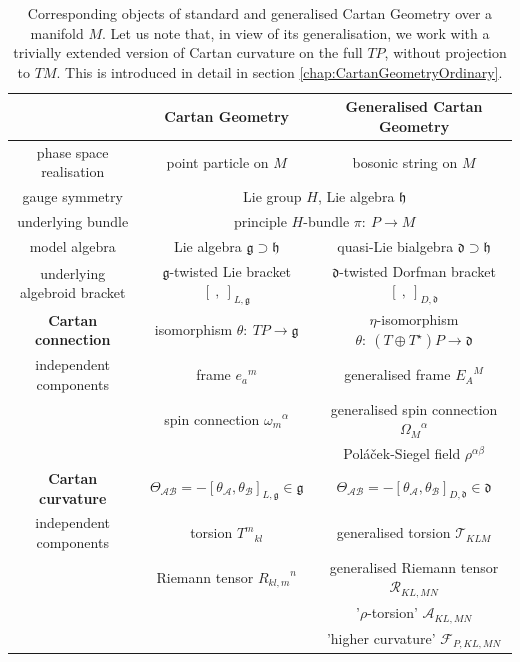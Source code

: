 \documentclass[11pt,a4paper]{article}
\numberwithin{equation}{section}
\begin{document}
\begin{table}
\centering \small
    \begin{tabular}{c|cc}
        		& Cartan Geometry & Generalised Cartan Geometry \\ \hline
      	phase space realisation & point particle on $M$ & bosonic string on $M$\\
       	gauge symmetry & \multicolumn{2}{c}{Lie group $H$, Lie algebra $\mathfrak{h}$} \\
       	underlying bundle & \multicolumn{2}{c}{principle $H$-bundle $\pi: \ P \rightarrow M$} \\
        model algebra & Lie algebra $\mathfrak{g} \supset \mathfrak{h}$ & quasi-Lie bialgebra $\mathfrak{d}\supset \mathfrak{h}$ \\
        underlying algebroid bracket & $\mathfrak{g}$-twisted Lie bracket $[ \ , \ ]_{L,\mathfrak{g}}$ & $\mathfrak{d}$-twisted Dorfman bracket $[ \ , \ ]_{D,\mathfrak{d}}$ \\ \hline
        \textbf{Cartan connection} & isomorphism $\theta: \ TP \rightarrow \mathfrak{g}$ & $\eta$-isomorphism $\theta: \ (T \oplus T^\star)P \rightarrow \mathfrak{d}$ \\ \hline
        independent components & frame ${e_a}^m$ & generalised frame ${E_A}^M$ \\
        		& spin connection ${\omega_m}^\alpha$ & generalised spin connection ${\Omega_M}^\alpha$ \\
        		& & Poláček-Siegel field $\rho^{\alpha \beta}$ \\ \hline
        \textbf{Cartan curvature} & $\Theta_{\mathcal{A}\mathcal{B}} = - [\theta_{\mathcal{A}} , \theta_{\mathcal{B}}]_{L,\mathfrak{g}} \in \mathfrak{g}$ & $\Theta_{\mathcal{A}\mathcal{B}} = - [\theta_{\mathcal{A}} , \theta_{\mathcal{B}}]_{D,\mathfrak{d}} \in \mathfrak{d}$ \\ \hline
        independent components & torsion ${T^m}_{kl} $ & generalised torsion $\mathcal{T}_{KLM}$ \\
        & Riemann tensor ${R_{kl,m}}^n$ & generalised Riemann tensor ${\mathcal{R}_{KL,MN}}$ \\
        & & '$\rho$-torsion' $\mathcal{A}_{KL,MN}$ \\
        & & 'higher curvature' $\mathcal{F}_{P,KL,MN}$
    \end{tabular}
    \label{tab:Dictionary}
    \caption{Corresponding objects of standard and generalised Cartan Geometry over a manifold $M$. Let us note that, in view of its generalisation, we work with a trivially extended version of Cartan curvature on the full $TP$, without projection to $TM$. This is introduced in detail in section \ref{chap:CartanGeometryOrdinary}.}
\end{table}
\end{document}
